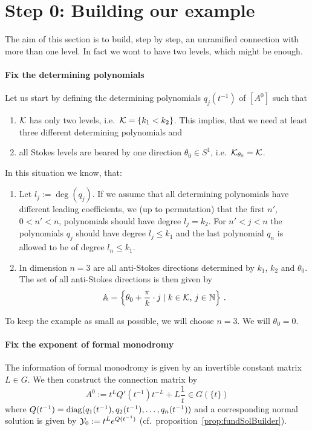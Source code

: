 \section{Step 0: Building our example}
The aim of this section is to build, step by step, an unramified connection
with more than one level.
In fact we wont to have two levels, which might be enough.

\paragraph{Fix the determining polynomials}
Let us start by defining the determining polynomials $q_j(t^{-1})$ of $[A^0]$
such that
\begin{enumerate}
  \item $\mathcal{K}$ has only two levels, i.e.\  $\mathcal{K}=\{k_1<k_2\}$.
    This implies, that we need at least three different determining
    polynomials and
  \item all Stokes levels are beared by one direction $\theta_0\in S^1$,
    i.e.\ $\mathcal{K}_{\theta_0}=\mathcal{K}$.
\end{enumerate}
\begin{rem}
  In this situation we know, that:
  \begin{enumerate}
    \item
      Let $l_j:=\deg(q_j)$.
      If we assume that all determining polynomials have different leading
      coefficients, we  (up to permutation) that the first
      $n'$, $0<n'<n$, polynomials should have degree $l_j=k_2$.
      For $n'<j<n$ the polynomials $q_j$ should have degree $l_j\leq k_1$ and
      the last polynomial $q_n$ is allowed to be of degree $l_n\leq k_1$.
    \item In dimension $n=3$ are all anti-Stokes directions determined by
      $k_1$, $k_2$ and $\theta_0$.  The set of all anti-Stokes directions is
      then given by
      \[
        \mathbb{A}=\left\{
            \theta_0+\frac{\pi}{k}\cdot j\mid k\in\mathcal{K}\text{, } j\in\mathbb{N}
          \right\}\,.
      \]
  \end{enumerate}
\end{rem}
To keep the example as small as possible, we will choose $n=3$.
We will  $\theta_0=0$.

\paragraph{Fix the exponent of formal monodromy}
The information of formal monodromy is given by an invertible constant matrix
$L\in G$.
We then construct the connection matrix by
\[
  A^0:=t^LQ'(t^{-1})t^{-L}+L\frac{1}{t} \in G(\!\{t\}\!)
\]
where $Q(t^{-1})=\operatorname{diag}(q_1(t^{-1}),q_2(t^{-1}),\dots,q_n(t^{-1}))$ and
a corresponding normal solution is given by $\mathcal{Y}_0:=t^Le^{Q(t^{-1})}$
(cf.\ proposition~\ref{prop:fundSolBuilder}).
\begin{comment}
  If we assume that $L$ is diagonal, we can use the commutation of diagonal
  matrices to write $A^0:=Q'(t^{-1})+L\frac{1}{t}$.
\end{comment}

